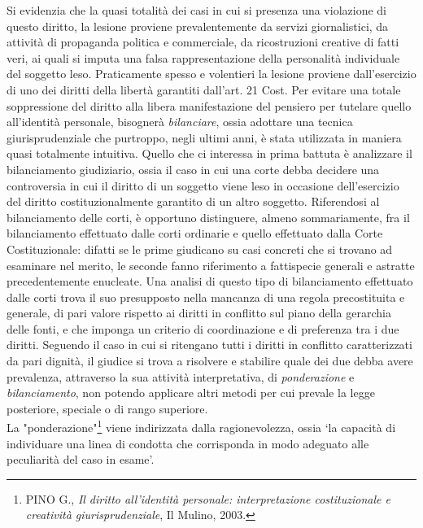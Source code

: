 Si evidenzia che la quasi totalità dei casi in cui si presenza una violazione di questo diritto, la lesione proviene prevalentemente da servizi giornalistici, da attività di propaganda politica e commerciale, da ricostruzioni creative di fatti veri, ai quali si imputa una falsa rappresentazione della personalità individuale del soggetto leso. Praticamente spesso e volentieri la lesione proviene dall’esercizio di uno dei diritti della libertà garantiti dall’art. 21 Cost. Per evitare una totale soppressione del diritto alla libera manifestazione del pensiero per tutelare quello all’identità personale, bisognerà \textit{bilanciare}, ossia adottare una tecnica giurisprudenziale che purtroppo, negli ultimi anni, è stata utilizzata in maniera quasi totalmente intuitiva.
Quello che ci interessa in prima battuta è analizzare il bilanciamento giudiziario, ossia il caso in cui una corte debba decidere una controversia in cui il diritto di un soggetto viene leso in occasione dell’esercizio del diritto costituzionalmente garantito di un altro soggetto. 
Riferendosi al bilanciamento delle corti, è opportuno distinguere, almeno sommariamente, fra il bilanciamento effettuato dalle corti ordinarie e quello effettuato dalla Corte Costituzionale: difatti se le prime giudicano su casi concreti che si trovano ad esaminare nel merito, le seconde fanno riferimento a fattispecie generali e astratte precedentemente enucleate. Una analisi di questo tipo di bilanciamento effettuato dalle corti trova il suo presupposto nella mancanza di una regola precostituita e generale, di pari valore rispetto ai diritti in conflitto sul piano della gerarchia delle fonti, e che imponga un criterio di coordinazione e di preferenza tra i due diritti.
Seguendo il caso in cui si ritengano tutti i diritti in conflitto caratterizzati da pari dignità, il giudice si trova a risolvere e stabilire quale dei due debba avere prevalenza, attraverso la sua attività interpretativa, di \textit{ponderazione} e \textit{bilanciamento}, non potendo applicare altri metodi per cui prevale la legge posteriore, speciale o di rango superiore. %
\\La "ponderazione"\footnote{PINO G.,\textit{ Il diritto all'identità personale: interpretazione costituzionale e creatività giurisprudenziale}, Il Mulino, 2003.} viene indirizzata dalla ragionevolezza, ossia ‘la capacità di individuare una linea di condotta che corrisponda in modo adeguato alle peculiarità del caso in esame’.
